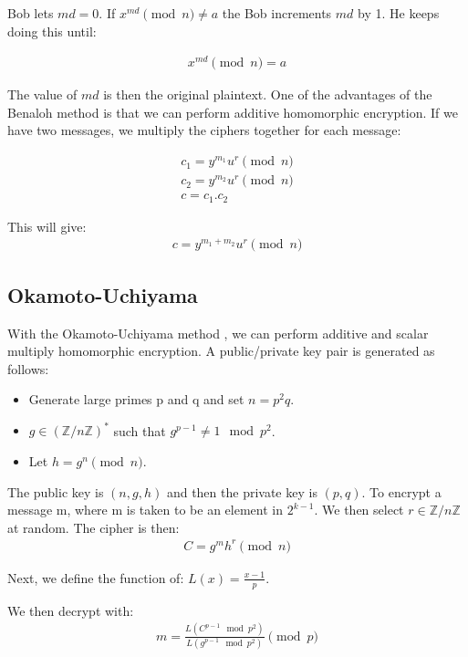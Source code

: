 \documentclass[envcountsame,runningheads,notitlepage]{llncs}
\begin{document}
Bob lets $md = 0$. If $x^{md} \pmod n \neq a$ the Bob increments $md$ by 1. He keeps doing this until:

\begin{align}
x^{md} \pmod n = a
\end{align}

The value of $md$ is then the original plaintext. One of the advantages of the Benaloh method is that we can perform additive homomorphic encryption. If we have two messages, we multiply the ciphers together for each message:

\begin{align}
c _1= y^{m_1} u^r \pmod n\\
c _2= y^{m_2} u^r \pmod n\\
c=c_1.c_2
\end{align}

This will give:
\begin{align}
c = y^{m_1+m_2} u^r \pmod n
\end{align}

\subsection{Okamoto-Uchiyama}
With the Okamoto-Uchiyama method \cite{okamoto1998new,asecuritysite_10221},  we can perform additive and scalar multiply homomorphic encryption. A public/private key pair is generated as follows:

\begin{itemize}
    \item Generate large primes p and q and set $n = p^2 q$.
    \item $ g\in ({\mathbb {Z}}/n{\mathbb {Z}})^{*}$ such that $g^{p-1}\neq 1\mod p^{2}$.
    \item Let $h = g^n \pmod n$.
\end{itemize}

 The public key is $(n, g, h)$ and then the private key is $(p, q)$. To encrypt a message m, where m is taken to be an element in $2^{k-1}$. We then select $ r\in \mathbb {Z} /n\mathbb {Z}$ at random. The cipher is then:
\begin{align}
C=g^{m}h^{r} \pmod n
\end{align}

Next, we define the function of: $L(x)=\frac{x-1}{p}$.

We then decrypt with:
\begin{align}
m={\frac {L\left(C^{{p-1}}\mod p^{2}\right)}{L\left(g^{{p-1}}\mod p^{2}\right)}} \pmod p
\end{align}
\end{document}
